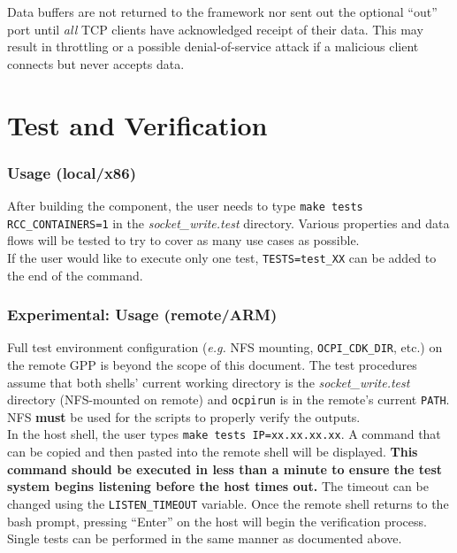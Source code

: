 Data buffers are not returned to the framework nor sent out the optional ``out'' port until \textit{all} TCP clients have acknowledged receipt of their data.
This may result in throttling or a possible denial-of-service attack if a malicious client connects but never accepts data.

\section*{Test and Verification}

\subsubsection*{Usage (local/x86)}
After building the component, the user needs to type \verb+make tests RCC_CONTAINERS=1+ in the \textit{socket\_write.test} directory. Various properties and data flows will be tested to try to cover as many use cases as possible. \\

If the user would like to execute only one test, \verb+TESTS=test_XX+ can be added to the end of the command.

\subsubsection*{\textbf{Experimental}: Usage (remote/ARM)}
Full test environment configuration (\textit{e.g.} NFS mounting, \verb+OCPI_CDK_DIR+, etc.) on the remote GPP is beyond the scope of this document. The test procedures assume that both shells' current working directory is the \textit{socket\_write.test} directory (NFS-mounted on remote) and \verb+ocpirun+ is in the remote's current \verb+PATH+. NFS \textbf{must} be used for the scripts to properly verify the outputs. \\

In the host shell, the user types \verb+make tests IP=xx.xx.xx.xx+. A command that can be copied and then pasted into the remote shell will be displayed. \textbf{This command should be executed in less than a minute to ensure the test system begins listening before the host times out.} The timeout can be changed using the \verb+LISTEN_TIMEOUT+ variable. Once the remote shell returns to the bash prompt, pressing ``Enter'' on the host will begin the verification process. \\

Single tests can be performed in the same manner as documented above.

